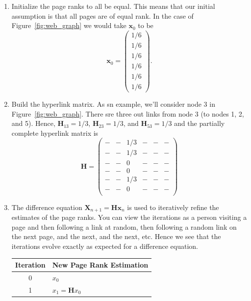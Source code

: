 \documentclass{article}
\begin{document}
\begin{enumerate}
    \item Initialize the page ranks to all be equal. This means that our initial assumption is that all pages are of equal rank. In the case of Figure~\ref{fig:web_graph} we would take $\boldsymbol{x}_0$ to be
        $$
            \boldsymbol{x}_0=
            \begin{pmatrix}
                1/6\\1/6\\1/6\\1/6\\1/6\\1/6
            \end{pmatrix}.
        $$
    \item Build the hyperlink matrix. As sn example, we'll consider node 3 in Figure~\ref{fig:web_graph}.
            There sre three out links from node 3 (to nodes 1, 2, and 5). Hence, $\boldsymbol{H}_{13}=1/3$, $\boldsymbol{H}_{23}=1/3$, and $\boldsymbol{H}_{53}=1/3$ 
            and the partially complete hyperlink matrix is
            $$\boldsymbol{H}=\begin{pmatrix}
                -&-&1/3&-&-&-\\
                -&-&1/3&-&-&-\\
                -&-&0&-&-&-\\
                -&-&0&-&-&-\\
                -&-&1/3&-&-&-\\
                -&-&0&-&-&-\\
            \end{pmatrix}
            $$
    \item The difference equation $\boldsymbol{X}_{n+1}=\boldsymbol{H}\boldsymbol{x}_n$ is used to iteratively refine the estimates of the page ranks. You can view the iterations as a person visiting a page and then following a link at random, then following a random link on the next page, and the next, and the next, etc. Hence we see that the iterations evolve exactly as expected for a difference equation.
            \begin{table}[H]
                \centering
                \begin{tabular}{|c|>{\raggedright\arraybackslash}p{6cm}|}
                \hline
                \textbf{Iteration} & \textbf{New Page Rank Estimation} \\
                \hline
                0 & $x_0$ \\
                1 & $x_1 = \boldsymbol{H} x_0$ \\

\end{tabular}
\end{table}
\end{enumerate}
\end{document}
